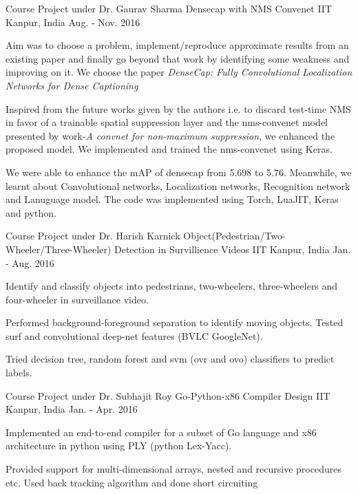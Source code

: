 \begin{cventries}
	\cventry
	{Course Project under Dr. Gaurav Sharma} %
	{Densecap with NMS Convenet} %
	{IIT Kanpur, India} %
	{Aug. - Nov. 2016} %
	{
		\begin{cvitems} %
			\item Aim was to choose a problem, implement/reproduce approximate results from an existing paper and finally go beyond that work by identifying some weakness and improving on it. We choose the paper \textit{DenseCap: Fully Convolutional Localization Networks for Dense Captioning}
			\item Inspired from the future works given by the authors i.e. to discard test-time NMS in favor of a trainable spatial suppression layer and the nms-convenet model presented by work-\textit{A convnet for non-maximum suppression},  we enhanced the proposed model. We implemented and trained the nms-convenet using Keras. 
			\item We were able to enhance the mAP of densecap from 5.698 to 5.76. Meanwhile, we learnt about Convolutional networks, Localization networks, Recognition network and Lanuguage model. The code was implemented using Torch, LuaJIT, Keras and python. 
		\end{cvitems}
	}
	
	
	\cventry
	{Course Project under Dr. Harish Karnick} %
	{Object(Pedestrian/Two-Wheeler/Three-Wheeler) Detection in Survillience Videos} %
	{IIT Kanpur, India} %
	{Jan. - Aug. 2016} %
	{
		\begin{cvitems} %
			\item {Identify and classify objects into pedestrians, two-wheelers, three-wheelers and four-wheeler in surveillance video.}
			\item {Performed background-foreground separation to identify moving objects. Tested surf and convolutional deep-net features (BVLC GoogleNet).}
			\item {Tried decision tree, random forest and svm (ovr and ovo) classifiers to predict labels.}
		\end{cvitems}
	}
	
	
	\cventry
	{Course Project under Dr. Subhajit Roy} %
	{Go-Python-x86 Compiler Design} %
	{IIT Kanpur, India} %
	{Jan. - Apr. 2016} %
	{
		\begin{cvitems} %
			\item Implemented an end-to-end compiler for a subset of Go language and x86 architecture in python using PLY (python Lex-Yacc).
			\item Provided support for multi-dimensional arrays, nested and recursive procedures etc. Used back tracking algorithm and done short circuiting
		\end{cvitems}
	}
	

\end{cventries}
